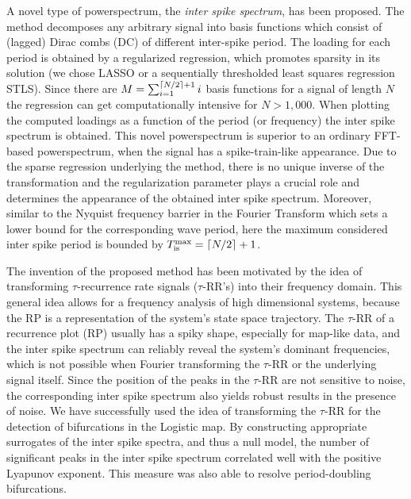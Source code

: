 \documentclass[entropy,article,submit,pdftex,moreauthors]{Definitions/mdpi}
\DeclarePairedDelimiter\ceil{\lceil}{\rceil}
\begin{document}
A novel type of powerspectrum, the \textit{inter spike spectrum}, has been proposed. The method decomposes any arbitrary signal into basis functions which consist of (lagged) Dirac 
combs (DC) of different inter-spike period. The loading for each period is obtained by a regularized regression, which promotes sparsity in its solution (we chose LASSO or a sequentially 
thresholded least squares regression STLS). Since there are 
$M = \sum_{i=1}^{\ceil*{N/2}+1}i$ basis functions for a signal of length $N$ the regression can get computationally intensive for $N>1,000$. When plotting the computed loadings as a function 
of the period (or frequency) the inter spike spectrum is obtained. This novel powerspectrum is superior to an ordinary FFT-based powerspectrum, when the signal has a spike-train-like 
appearance. Due to the sparse regression underlying the method, there is no unique inverse of the transformation and the regularization parameter plays a crucial role and determines the 
appearance of the obtained inter spike spectrum. Moreover, similar to the Nyquist frequency barrier in the Fourier Transform which sets a lower bound for the corresponding wave period, here 
the maximum considered inter spike period is bounded by $T_{\text{is}}^{\text{max}} = \ceil*{N/2}+1$.

The invention of the proposed method has been motivated by the idea of transforming $\tau$-recurrence rate signals ($\tau$-RR's) into their frequency domain. 
This general idea \cite{Zbilut2008} allows for a frequency analysis of high dimensional systems, because the RP is a representation of the system's state space trajectory.   
The $\tau$-RR of a recurrence plot (RP) usually has a spiky shape, especially for map-like data, and the inter spike spectrum can reliably reveal the system's dominant frequencies, 
which is not possible when Fourier transforming the $\tau$-RR or the underlying signal itself. Since the position of the peaks 
in the $\tau$-RR are not sensitive to noise, the corresponding inter spike spectrum also yields robust results in the presence of noise. We have successfully used the idea 
of transforming the $\tau$-RR for the detection of bifurcations in the Logistic map. By constructing appropriate surrogates of the inter spike spectra, and thus a null model, 
the number of significant peaks in the inter spike spectrum correlated well with the positive Lyapunov exponent. This measure was also able to resolve period-doubling bifurcations. 
\end{document}
